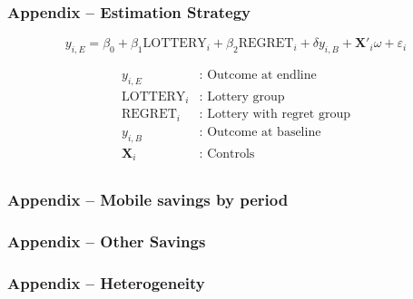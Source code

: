 \documentclass{beamer}
\begin{document}
\begin{frame} \frametitle{Appendix -- Estimation Strategy}

		$$ y_{i,E} = \beta_{0} + \beta_{1}\text{LOTTERY}_{i} + \beta_{2}\text{REGRET}_{i} + \delta y_{i,B} + \mathbf{X}'_i \omega + \varepsilon_{i} $$

		\begin{align*} y_{i,E} & \text{: Outcome at endline} \\
						\text{LOTTERY}_{i} & \text{: Lottery group} \\
						\text{REGRET}_{i} & \text{: Lottery with regret group} \\
						y_{i,B} & \text{: Outcome at baseline} \\
						\mathbf{X}_i & \text{: Controls} \\
		\end{align*}

\end{frame}

\begin{frame} \frametitle{Appendix -- Mobile savings by period}

	\begin{landscape}  \end{landscape}

\end{frame}

\begin{frame} \frametitle{Appendix -- Other Savings}

	\begin{landscape}  \end{landscape}

\end{frame}

\begin{frame} \frametitle{Appendix -- Heterogeneity}

	

\end{frame}
\end{document}
